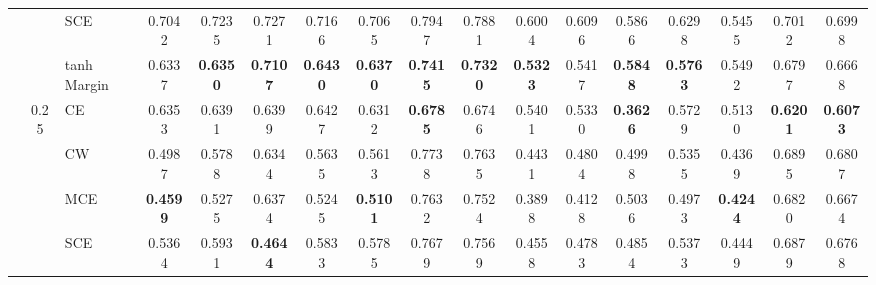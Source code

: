 \documentclass[sigconf,authordraft]{acmart}
\begin{document}
\begin{table*}
{\begin{tabular}{lcl|ccccccc|ccccccc}
                                 &      & SCE &                  0.7042 &                  0.7235 &              0.7271 &                  0.7166 &           0.7065 &                       0.7947 &                       0.7881 &                  0.6004 &                  0.6096 &              0.5866 &                  0.6298 &           0.5455 &                       0.7012 &                       0.6998 \\
                                 &      & tanh Margin &                  0.6337 &         \textbf{0.6350} &     \textbf{0.7107} &         \textbf{0.6430} &  \textbf{0.6370} &              \textbf{0.7415} &              \textbf{0.7320} &         \textbf{0.5323} &                  0.5417 &     \textbf{0.5848} &         \textbf{0.5763} &           0.5492 &                       0.6797 &                       0.6668 \\
    \cline{2-17}
                                 & \multirow{5}{*}{0.25} & CE &                  0.6353 &                  0.6391 &              0.6399 &                  0.6427 &           0.6312 &              \textbf{0.6785} &                       0.6746 &                  0.5401 &                  0.5330 &     \textbf{0.3626} &                  0.5729 &           0.5130 &              \textbf{0.6201} &              \textbf{0.6073} \\
                                 &      & CW &                  0.4987 &                  0.5788 &              0.6344 &                  0.5635 &           0.5613 &                       0.7738 &                       0.7635 &                  0.4431 &                  0.4804 &              0.4998 &                  0.5355 &           0.4369 &                       0.6895 &                       0.6807 \\
                                 &      & MCE &         \textbf{0.4599} &                  0.5275 &              0.6374 &                  0.5245 &  \textbf{0.5101} &                       0.7632 &                       0.7524 &                  0.3898 &                  0.4128 &              0.5036 &                  0.4973 &  \textbf{0.4244} &                       0.6820 &                       0.6674 \\
                                 &      & SCE &                  0.5364 &                  0.5931 &     \textbf{0.4644} &                  0.5833 &           0.5785 &                       0.7679 &                       0.7569 &                  0.4558 &                  0.4783 &              0.4854 &                  0.5373 &           0.4449 &                       0.6879 &                       0.6768 \\

\end{tabular}}
\end{table*}
\end{document}
